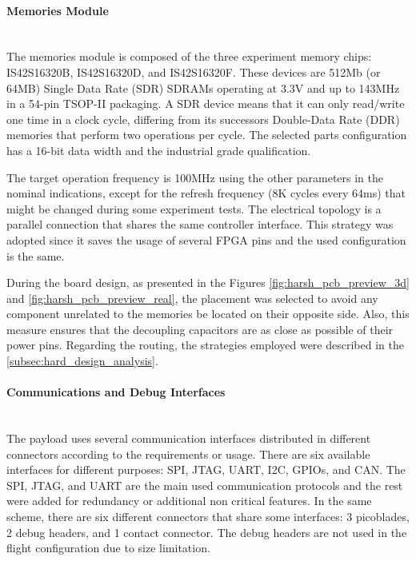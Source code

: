 \paragraph{Memories Module} \mbox{}\\

The memories module is composed of the three experiment memory chips: IS42S16320B, IS42S16320D, and IS42S16320F. These devices are 512Mb (or 64MB) Single Data Rate (SDR) SDRAMs operating at 3.3V and up to 143MHz in a 54-pin TSOP-II packaging. A SDR device means that it can only read/write one time in a clock cycle, differing from its successors Double-Data Rate (DDR) memories that perform two operations per cycle. The selected parts configuration has a 16-bit data width and the industrial grade qualification.

The target operation frequency is 100MHz using the other parameters in the nominal indications, except for the refresh frequency (8K cycles every 64ms) that might be changed during some experiment tests. The electrical topology is a parallel connection that shares the same controller interface. This strategy was adopted since it saves the usage of several FPGA pins and the used configuration is the same. 

During the board design, as presented in the Figures \ref{fig:harsh_pcb_preview_3d} and \ref{fig:harsh_pcb_preview_real}, the placement was selected to avoid any component unrelated to the memories be located on their opposite side. Also, this measure ensures that the decoupling capacitors are as close as possible of their power pins. Regarding the routing, the strategies employed were described in the \autoref{subsec:hard_design_analysis}.

\paragraph{Communications and Debug Interfaces} \mbox{}\\

The payload uses several communication interfaces distributed in different connectors according to the requirements or usage. There are six available interfaces for different purposes: SPI, JTAG, UART, I2C, GPIOs, and CAN. The SPI, JTAG, and UART are the main used communication protocols and the rest were added for redundancy or additional non critical features. In the same scheme, there are six different connectors that share some interfaces: 3 picoblades, 2 debug headers, and 1 contact connector. The debug headers are not used in the flight configuration due to size limitation.

